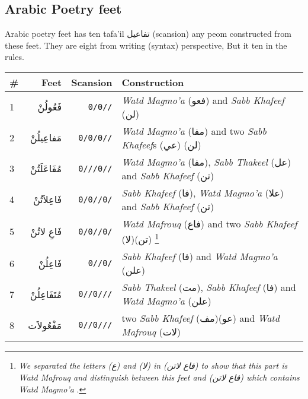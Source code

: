 \subsection{Arabic Poetry feet}

Arabic poetry feet has ten tafa'il \textarabic{تفاعيل} (scansion)  any peom constructed from these feet. They are eight from writing (syntax) perspective, But it ten in the rules.
\begin{savenotes}

\begin{table}[t]
  \centering
  \begin{tabular}{l r r l}
    \hline
    \textbf{\#} & \textbf{Feet} & \textbf{Scansion} & \textbf{Construction} \\
    \hline
    1 & \textarabic{فَعُولُنْ}  & \texttt{0/0//} & \textit{Watd Magmo'a} (\textarabic{فعو}) and \textit{Sabb Khafeef} (\textarabic{لن})   \\
    2 &\textarabic{مَفاعِيلُنْ}& \texttt{0/0/0//} & \textit{Watd Magmo'a} (\textarabic{مفا}) and two \textit{Sabb Khafeef}s (\textarabic{عي}) (\textarabic{لن})   \\
    3 &\textarabic{مُفَاعَلَتُنْ}& \texttt{0///0//}  &    \textit{Watd Magmo'a} (\textarabic{مفا}), \textit{Sabb Thakeel} (\textarabic{عل}) and \textit{Sabb Khafeef} (\textarabic{تن}) \\
    4 &\textarabic{فَاعِلاَتُنْ} & \texttt{0/0//0/}   & \textit{Sabb Khafeef} (\textarabic{فا}), \textit{Watd Magmo'a} (\textarabic{علا}) and \textit{Sabb Khafeef} (\textarabic{تن})   \\
    5 &\textarabic{فَاعِ لاتُنْ} & \texttt{0/0//0/}  &  \textit{Watd Mafrouq} (\textarabic{فاع}) and two \textit{Sabb Khafeef} (\textarabic{لا})(\textarabic{تن}) \footnote{\textit{We separated the letters (\textarabic{ع}) and (\textarabic{لا}) in (\textarabic{فاع لاتن}) to show that this part is \textit{Watd Mafrouq} and distinguish between this feet  and (\textarabic{فاع لاتن}) which contains \textit{Watd Magmo'a}  }.}  \\
    6 &\textarabic{فَاعِلُنْ}  & \texttt{0//0/}   & \textit{Sabb Khafeef} (\textarabic{فا}) and \textit{Watd Magmo'a} (\textarabic{علن})\\
    7 &\textarabic{مُتَفَاعِلُنْ}& \texttt{0//0///}  & \textit{Sabb Thakeel} (\textarabic{مت}), \textit{Sabb Khafeef} (\textarabic{فا}) and \textit{Watd Magmo'a} (\textarabic{علن})  \\
    8 &\textarabic{مَفْعُولاَت} & \texttt{0//0///}   & two \textit{Sabb Khafeef} (\textarabic{مف})(\textarabic{عو}) and \textit{Watd Mafrouq} (\textarabic{لات}) \\

\end{tabular}
\end{table}
\end{savenotes}
